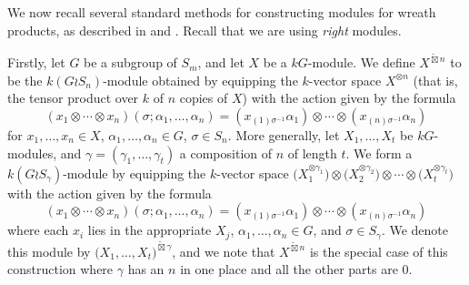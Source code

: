 We now recall several standard methods for constructing modules for wreath products, as described in
\cite[Section 4.3]{JAMKER} and \cite[Section 3]{CHTAN}. Recall that we are using \textit{right} modules.

Firstly, let $G$ be a subgroup of $S_m$, and
let $X$ be a $kG$-module. We define $X^{\widetilde\boxtimes n}$ to be the $k(G{\wr}S_n)$-module obtained by
equipping the $k$-vector space $X^{\otimes n}$ (that is, the tensor product over $k$ of $n$ copies of $X$) with the action given by the
formula
\[
	(x_1\otimes\cdots\otimes x_n)(\sigma;\alpha_1,\ldots,\alpha_n) = (x_{(1)\sigma^{-1}}\alpha_1)\otimes\cdots
	\otimes(x_{(n)\sigma^{-1}}\alpha_n)
\]
for $x_1,\ldots,x_n \in X$, $\alpha_1,\ldots,\alpha_n \in G$, $\sigma \in S_n$.
More generally, let $X_1,\ldots,X_t$ be $kG$-modules, and $\gamma = (\gamma_1,\ldots,\gamma_t)$ a composition of $n$ of length $t$.
We form a $k(G{\wr}S_{\gamma})$-module by equipping the $k$-vector space
$\bigl(X^{\otimes \gamma_1}_1\bigr)\otimes\bigl(X^{\otimes \gamma_2}_2\bigr)\otimes\cdots\otimes\bigl(X^{\otimes \gamma_t}_t\bigr)$
with the action given by the formula
\[
	(x_1\otimes\cdots\otimes x_n)(\sigma;\alpha_1,\ldots,\alpha_n) = (x_{(1)\sigma^{-1}}\alpha_1)\otimes\cdots
	\otimes(x_{(n)\sigma^{-1}}\alpha_n)
\]
where each $x_i$ lies in the appropriate $X_j$, $\alpha_1,\ldots,\alpha_n \in G$, and $\sigma \in S_{\gamma}$. We denote this module by
$\bigl(X_1,\ldots,X_t\bigr)^{\widetilde\boxtimes \gamma}$, and we note that $X^{\widetilde\boxtimes n}$ is the
special case of this construction where $\gamma$ has an $n$ in one place and all the other parts are 0.

